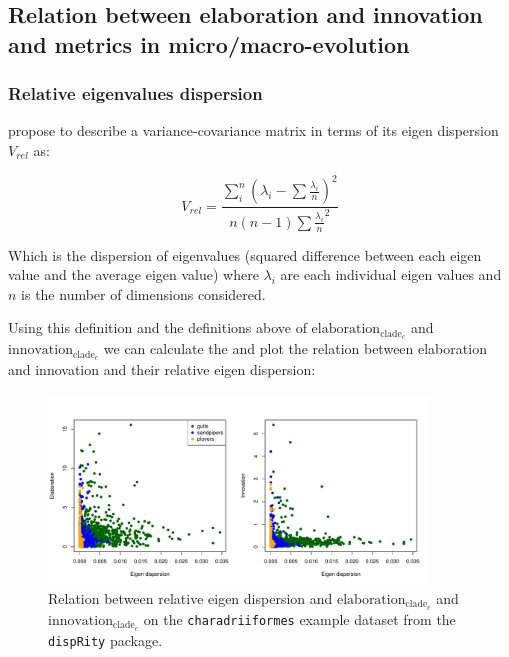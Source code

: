 \documentclass[12pt,a4paper]{article}
\begin{document}
\subsection{Relation between elaboration and innovation and metrics in micro/macro-evolution}

\subsubsection{Relative eigenvalues dispersion}

\cite{vanvalen1974,watanabe2022} propose to describe a variance-covariance matrix in terms of its eigen dispersion $V_{rel}$ as:

\begin{equation}
V_{rel} = \frac{\sum_{i}^{n}(\lambda_{i} - \sum{\frac{\lambda_{i}}{n}})^2}{n(n-1)\sum{\frac{\lambda_{i}}{n}}^2}
\end{equation}

Which is the dispersion of eigenvalues (squared difference between each eigen value and the average eigen value) where $\lambda_{i}$ are each individual eigen values and $n$ is the number of dimensions considered.

Using this definition and the definitions above of $\text{elaboration}_{\text{clade}_{c}}$ and $\text{innovation}_{\text{clade}_{c}}$ we can calculate the and plot the relation between elaboration and innovation and their relative eigen dispersion:

\begin{figure}[H]
\centering
   \includegraphics[width=0.9\textwidth]{Figures/elaboration_innovation_dispersion.pdf}
\caption{Relation between relative eigen dispersion \cite{vanvalen1974,watanabe2022} and $\text{elaboration}_{\text{clade}_{c}}$ and $\text{innovation}_{\text{clade}_{c}}$ on the \texttt{charadriiformes} example dataset from the \texttt{dispRity} package.}
\label{Fig:eigen_dispersion}
\end{figure}
\end{document}
